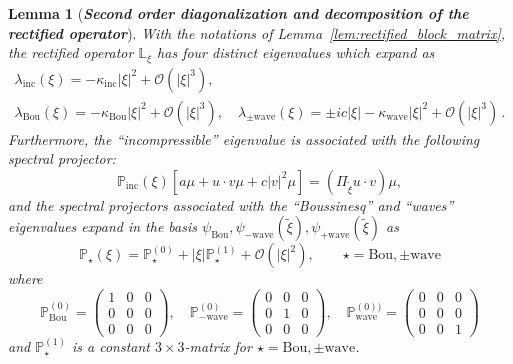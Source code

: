 \documentclass[10pt]{amsart}
\newtheorem{lemm}[theo]{Lemma}\newtheorem{prop}[theo]{Proposition}\newtheorem{coro}[theo]{Corollary}\newtheorem{conj}[theo]{Conjecture}
\theoremstyle{definition}\newtheorem{defi}[theo]{Definition}\newtheorem{rema}[theo]{Remark}\newtheorem{exam}[theo]{Example}\newtheorem{exem}[theo]{Example}\newtheorem{nota}[theo]{Notation}
\newcommand{\Wave}{\mathrm{wave}}
\newcommand{\Inc}{\mathrm{inc}}
\newcommand{\Bou}{\mathrm{Bou}}
\newcommand{\rectL}{\mathbb{L}}
\newcommand{\bbP}{\mathbb{P}}
\newcommand{\OO}{\mathcal{O}}
\begin{document}
\newcommand{\rectP}{\bbP}
\begin{lemm}[\emph{\textbf{Second order diagonalization and decomposition of the rectified operator}}]\label{lem:diagonalization_rectified}
With the notations of Lemma~\ref{lem:rectified_block_matrix}, the rectified operator $\rectL_\xi$ has four distinct eigenvalues which expand as
\begin{gather*}
\lambda_\Inc(\xi) = - \kappa_\Inc | \xi |^2 + \OO\left(|\xi|^3 \right), \\
\lambda_\Bou(\xi) = - \kappa_\Bou | \xi |^2 + \OO\left(|\xi|^3 \right), \quad
\lambda_{\pm \Wave}(\xi) = \pm i c | \xi| - \kappa_\Wave |\xi|^2 + \OO\left(|\xi|^3 \right)\,.
\end{gather*}
Furthermore, the ``incompressible'' eigenvalue is associated with the following spectral projector:
\begin{equation*}
\rectP_\Inc\left(\xi \right) \left[a \mu + u \cdot v \mu + c |v|^2 \mu \right] = {\left(\Pi_{\widetilde{\xi}}u\cdot v\right)} \mu,
\end{equation*}
and the spectral projectors associated with the ``Boussinesq'' and ``waves'' eigenvalues expand in the basis $\psi_{\Bou}, \psi_{- \Wave}\left(\widetilde{\xi} \right), \psi_{+ \Wave}\left(\widetilde{\xi} \right)$ as
\begin{equation}\label{eq:textbook_expansion_projector}
\rectP_{\star}(\xi)=\rectP_{\star}^{(0)} + |\xi|\rectP^{(1)}_{\star}+\OO\left(|\xi|^{2}\right), \qquad \star=\Bou,\pm\Wave
\end{equation}
where
\begin{equation}\label{eq:textbook_rectP0}
\rectP_{\Bou}^{(0)}= \left(
\begin{matrix}
1 & 0 & 0 \\ 0 & 0 & 0 \\ 0 & 0 & 0
\end{matrix}\right), \quad \rectP_{-\Wave}^{(0)} = \left(
\begin{matrix}
0 & 0 & 0 \\ 0 & 1 & 0 \\ 0 & 0 & 0
\end{matrix}\right), \quad \rectP_{\Wave}^{(0))} = \left(
\begin{matrix}
0 & 0 & 0 \\ 0 & 0 & 0 \\ 0 & 0 & 1
\end{matrix}\right)
\end{equation}
and $\rectP_{\star}^{(1)}$ is a constant $3\times 3$-matrix for $\star=\Bou,\pm\Wave$.
\end{lemm}
\end{document}

